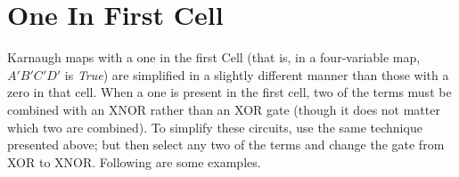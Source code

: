\section{One In First Cell}
\label{KM:sec:one_in_first_cell}

Karnaugh maps with a one in the first Cell (that is, in a four-variable map, $ A'B'C'D' $ is \emph{True}) are simplified in a slightly different manner than those with a zero in that cell. When a one is present in the first cell, two of the terms must be combined with an \textsf{XNOR} rather than an \textsf{XOR} gate (though it does not matter which two are combined). To simplify these circuits, use the same technique presented above; but then select any two of the terms and change the gate from \textsf{XOR} to \textsf{XNOR}. Following are some examples. 

